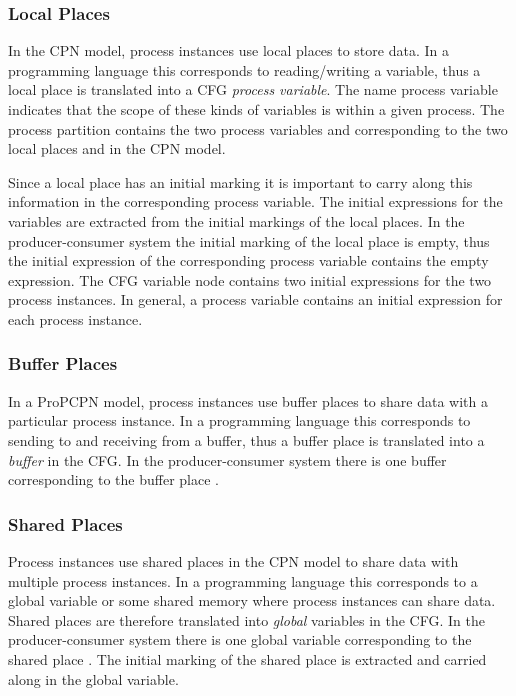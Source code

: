 \subsubsection{Local Places}
In the CPN model, process instances use local places to store data. In a programming language this corresponds to reading/writing a variable, thus a local place is translated into a CFG \emph{process variable}. The name process variable indicates that the scope of these kinds of variables is within a given process. The  process partition contains the two process variables  and  corresponding to the two local places  and  in the CPN model. 

Since a local place has an initial marking it is important to carry along this information in the corresponding process variable. The initial expressions for the variables are extracted from the initial markings of the local places. In the producer-consumer system the initial marking of the local place  is empty, thus the initial expression of the corresponding process variable contains the empty expression. The CFG variable node  contains two initial expressions for the two  process instances. In general, a process variable contains an initial expression for each process instance. 


\subsubsection{Buffer Places}
In a ProPCPN model, process instances use buffer places to share data with a particular process instance. In a programming language this corresponds to sending to and receiving from a buffer, thus a buffer place is translated into a \emph{buffer} in the CFG. In the producer-consumer system there is one buffer corresponding to the buffer place .


\subsubsection{Shared Places}
Process instances use shared places in the CPN model to share data with multiple process instances. In a programming language this corresponds to a global variable or some shared memory where process instances can share data. Shared places are therefore translated into \emph{global} variables in the CFG. In the producer-consumer system there is one global variable corresponding to the shared place . The initial marking of the shared place is extracted and carried along in the global variable. 

